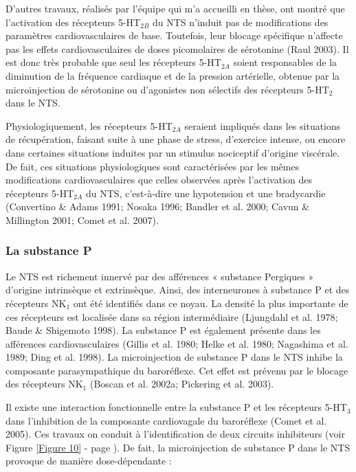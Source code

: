 \documentclass[a4paper,12pt,twoside]{report}
\begin{document}
D’autres travaux, réalisés par l’équipe qui m’a accueilli en thèse, ont montré que l’activation des récepteurs 5-HT$_{2B}$ du NTS n’induit pas de modifications des paramètres cardiovasculaires de base. Toutefois, leur blocage spécifique n’affecte pas les effets cardiovasculaires de doses picomolaires de sérotonine (Raul 2003). Il est donc très probable que seul les récepteurs 5-HT$_{2A}$ soient responsables de la diminution de la fréquence cardiaque et de la pression artérielle, obtenue par la microinjection de sérotonine ou d’agonistes non sélectifs des récepteurs 5-HT$_{2}$ dans le NTS. 

Physiologiquement, les récepteurs 5-HT$_{2A}$ seraient impliqués dans les situations de récupération, faisant suite à une phase de stress, d’exercice intense, ou encore dans certaines situations induites par un stimulus nociceptif d’origine viscérale. De fait, ces situations physiologiques sont caractérisées par les mêmes modifications cardiovasculaires que celles observées après l’activation des récepteurs 5-HT$_{2A}$ du NTS, c'est-à-dire une hypotension et une bradycardie (Convertino \& Adams 1991; Nosaka 1996; Bandler et al. 2000; Cavun \& Millington 2001; Comet et al. 2007).

\subsubsection{La substance P}

Le NTS est richement innervé par des afférences « substance Pergiques » d’origine intrinsèque et extrinsèque. Ainsi, des interneurones à substance P et des récepteurs NK$_{1}$ ont été identifiés dans ce noyau. La densité la plus importante de ces récepteurs est localisée dans sa région intermédiaire (Ljungdahl et al. 1978; Baude \& Shigemoto 1998). La substance P est également présente dans les afférences cardiovasculaires (Gillis et al. 1980; Helke et al. 1980; Nagashima et al. 1989; Ding et al. 1998). La microinjection de substance P dans le NTS inhibe la composante parasympathique du baroréflexe. Cet effet est prévenu par le blocage des récepteurs NK$_{1}$ (Boscan et al. 2002a; Pickering et al. 2003).

Il existe une interaction fonctionnelle entre la substance P et les récepteurs 5-HT$_{3}$ dans l’inhibition de la composante cardiovagale du baroréflexe (Comet et al. 2005). Ces travaux on conduit à l’identification de deux circuits inhibiteurs (voir Figure \ref{Figure 10} - page \pageref{Figure 10}). De fait, la microinjection de substance P dans le NTS provoque de manière dose-dépendante : 
\end{document}
